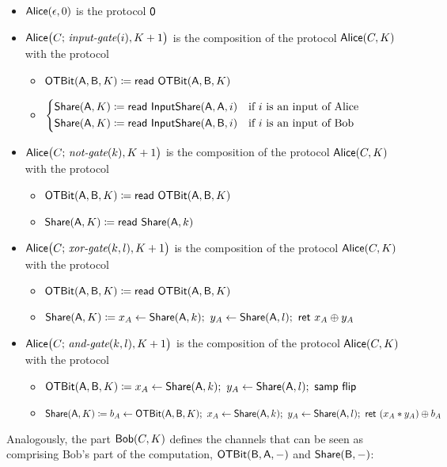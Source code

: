 \begin{itemize}
\item $\mathsf{Alice}(\epsilon,0)$ is the protocol $\mathsf{0}$
\item $\mathsf{Alice}\big(C; \, \textit{input-gate}(i),K+1\big)$ is the composition of the protocol $\mathsf{Alice}(C,K)$ with the protocol
\begin{itemize}
\item $\mathsf{OTBit}(\mathsf{A},\mathsf{B},K) \coloneqq \mathsf{read} \ \mathsf{OTBit}(\mathsf{A},\mathsf{B},K)$
\item $\begin{cases*} \Share(\A,K) \coloneqq \read{\InputShare(\A,\A,i)} & \text{if $i$ is an input of Alice} \\ \Share(\A,K) \coloneqq \read{\InputShare(\A,\B,i)} & \text{if $i$ is an input of Bob} \end{cases*}$
\end{itemize}
\item $\mathsf{Alice}\big(C; \, \textit{not-gate}(k),K+1\big)$ is the composition of the protocol $\mathsf{Alice}(C,K)$ with the protocol
\begin{itemize}
\item $\mathsf{OTBit}(\mathsf{A},\mathsf{B},K) \coloneqq \mathsf{read} \ \mathsf{OTBit}(\mathsf{A},\mathsf{B},K)$
\item $\mathsf{Share}(\mathsf{A},K) \coloneqq \mathsf{read} \ \mathsf{Share}(\mathsf{A},k)$
\end{itemize}
\item $\mathsf{Alice}\big(C; \, \textit{xor-gate}(k,l),K+1\big)$ is the composition of the protocol $\mathsf{Alice}(C,K)$ with the protocol
\begin{itemize}
\item $\mathsf{OTBit}(\mathsf{A},\mathsf{B},K) \coloneqq \mathsf{read} \ \mathsf{OTBit}(\mathsf{A},\mathsf{B},K)$
\item $\mathsf{Share}(\mathsf{A},K) \coloneqq x_A \leftarrow \mathsf{Share}(\mathsf{A},k); \ y_A \leftarrow \mathsf{Share}(\mathsf{A},l); \ \mathsf{ret} \ x_A \oplus y_A$
\end{itemize}
\item $\mathsf{Alice}\big(C; \, \textit{and-gate}(k,l),K+1\big)$ is the composition of the protocol $\mathsf{Alice}(C,K)$ with the protocol
\begin{itemize}
\item $\OTBit(\A,\B,K) \coloneqq x_A \leftarrow \Share(\A,k); \ y_A \leftarrow \Share(\A,l); \ \samp{\flip}$
\item $\mathsf{Share}(\mathsf{A},K) \coloneqq b_A \leftarrow \mathsf{OTBit}(\mathsf{A},\mathsf{B},K); \ x_A \leftarrow \mathsf{Share}(\mathsf{A},k); \ y_A \leftarrow \mathsf{Share}(\mathsf{A},l); \ \mathsf{ret} \ (x_A * y_A) \oplus b_A$
\end{itemize}
\end{itemize}

\noindent Analogously, the part $\mathsf{Bob}(C,K)$ defines the channels that can be seen as comprising Bob's part of the computation, $\mathsf{OTBit}(\mathsf{B},\mathsf{A},-)$ and $\mathsf{Share}(\mathsf{B},-)$:

